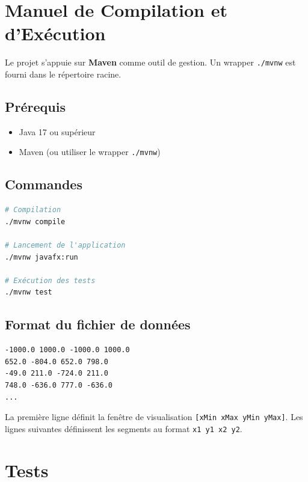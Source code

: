 \documentclass[11pt,a4paper]{article}
\begin{document}
\section{Manuel de Compilation et d'Exécution}

Le projet s'appuie sur \textbf{Maven} comme outil de gestion. Un wrapper \texttt{./mvnw} est fourni dans le répertoire racine.

\subsection{Prérequis}

\begin{itemize}
    \item Java 17 ou supérieur
    \item Maven (ou utiliser le wrapper \texttt{./mvnw})
\end{itemize}

\subsection{Commandes}

\begin{lstlisting}[language=bash, caption={Compilation et exécution}]
# Compilation
./mvnw compile

# Lancement de l'application
./mvnw javafx:run

# Exécution des tests
./mvnw test
\end{lstlisting}

\subsection{Format du fichier de données}

\begin{lstlisting}[caption={Exemple de fichier de données}]
-1000.0 1000.0 -1000.0 1000.0
652.0 -804.0 652.0 798.0
-49.0 211.0 -724.0 211.0
748.0 -636.0 777.0 -636.0
...
\end{lstlisting}

La première ligne définit la fenêtre de visualisation \texttt{[xMin xMax yMin yMax]}. Les lignes suivantes définissent les segments au format \texttt{x1 y1 x2 y2}.

\section{Tests}
\end{document}

